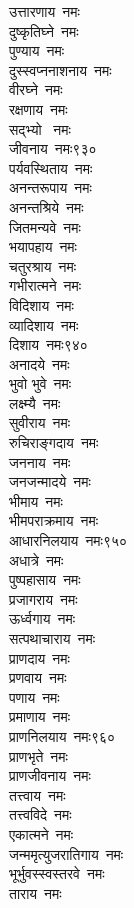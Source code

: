 \begin{multicols}{\maxColumns}
\begin{flushleft}
उत्तारणाय~नमः\\
दुष्कृतिघ्ने~नमः\\
पुण्याय~नमः\\
दुस्स्वप्ननाशनाय~नमः\\
वीरघ्ने~नमः\\
रक्षणाय~नमः\\
सद्भ्यो ~नमः\\
जीवनाय~नमः\hfill ९३०\\
पर्यवस्थिताय~नमः\\
अनन्तरूपाय~नमः\\
अनन्तश्रिये~नमः\\
जितमन्यवे~नमः\\
भयापहाय~नमः\\
चतुरश्राय~नमः\\
गभीरात्मने~नमः\\
विदिशाय~नमः\\
व्यादिशाय~नमः\\
दिशाय~नमः\hfill ९४०\\
अनादये~नमः\\
भुवो भुवे~नमः\\
लक्ष्म्यै~नमः\\
सुवीराय~नमः\\
रुचिराङ्गदाय~नमः\\
जननाय~नमः\\
जनजन्मादये~नमः\\
भीमाय~नमः\\
भीमपराक्रमाय~नमः\\
आधारनिलयाय~नमः\hfill ९५०\\
अधात्रे~नमः\\
पुष्पहासाय~नमः\\
प्रजागराय~नमः\\
ऊर्ध्वगाय~नमः\\
सत्पथाचाराय~नमः\\
प्राणदाय~नमः\\
प्रणवाय~नमः\\
पणाय~नमः\\
प्रमाणाय~नमः\\
प्राणनिलयाय~नमः\hfill ९६०\\
प्राणभृते~नमः\\
प्राणजीवनाय~नमः\\
तत्त्वाय~नमः\\
तत्त्वविदे~नमः\\
एकात्मने~नमः\\
जन्ममृत्युजरातिगाय~नमः\\
भूर्भुवस्स्वस्तरवे~नमः\\
ताराय~नमः\\

\end{flushleft}
\end{multicols}
